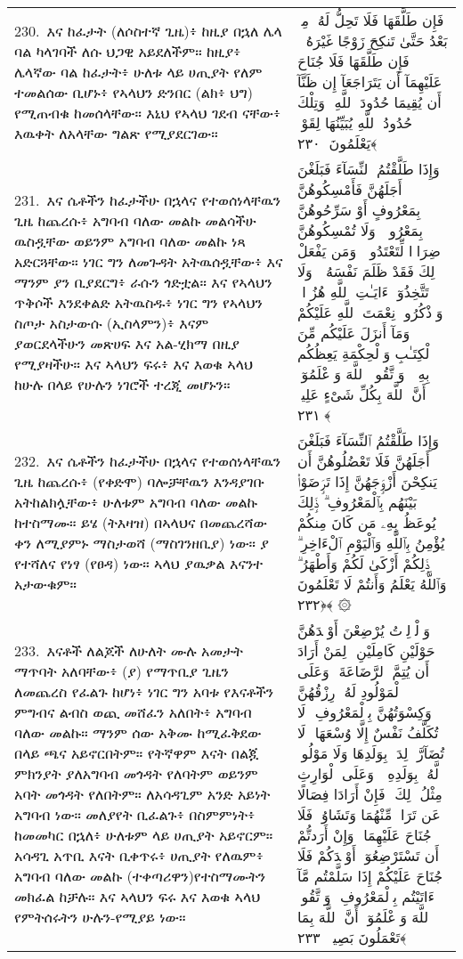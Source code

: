 \documentclass[11pt,a4paper,oneside]{article}%
\newcommand{\mytextarabic}[1]{\textarabic{ #1 \flushright}}
\begin{document}
\begin{longtable}{%
  @{}
    p{}
  @{~~~}
    p{}
    @{}
}
230.\ እና ከፈታት (ለሶስተኛ ጊዜ)፥ ከዚያ በኋለ ሌላ ባል ካላገባች ለሱ ህጋዊ አይደለችም። ከዚያ፥ ሌላኛው ባል ከፈታት፥ ሁለቱ ላይ ሀጢያት የለም ተመልሰው ቢሆኑ፥ የኣላህን ድንበር (ልክ፥ ህግ) የሚጠብቁ ከመሰላቸው። እኒህ የኣላህ ገደብ ናቸው፥ እዉቀት ለአላቸው ግልጽ የሚያደርገው። &  \mytextarabic{فَإِن طَلَّقَهَا فَلَا تَحِلُّ لَهُۥ مِنۢ بَعْدُ حَتَّىٰ تَنكِحَ زَوْجًا غَيْرَهُۥ ۗ فَإِن طَلَّقَهَا فَلَا جُنَاحَ عَلَيْهِمَآ أَن يَتَرَاجَعَآ إِن ظَنَّآ أَن يُقِيمَا حُدُودَ ٱللَّهِ ۗ وَتِلْكَ حُدُودُ ٱللَّهِ يُبَيِّنُهَا لِقَوْمٍۢ يَعْلَمُونَ ﴿٢٣٠﴾}\\
231.\ እና ሴቶችን ከፈታችሁ በኋላና የተወሰነላቸዉን ጊዜ ከጨረሱ፥ አግባብ ባለው መልኩ መልሳችሁ ዉስዷቸው ወይንም አግባብ ባለው መልኩ ነጻ አድርጓቸው። ነገር ግን ለመጉዳት አትዉሰዷቸው፥ እና ማንም ያን ቢያደርግ፥ ራሱን ጎድቷል። እና የኣላህን ጥቅሶች እንደቀልድ አትዉስዱ፥ ነገር ግን የኣላህን ስጦታ አስታውሱ (ኢስላምን)፥ እናም ያወርደላችሁን መጽሀፍ እና አል-ሂክማ በዚያ የሚያዛችሁ። እና ኣላህን ፍሩ፥ እና እወቁ ኣላህ ከሁሉ በላይ የሁሉን ነገሮች ተረጂ መሆኑን። &  \mytextarabic{ وَإِذَا طَلَّقْتُمُ ٱلنِّسَآءَ فَبَلَغْنَ أَجَلَهُنَّ فَأَمْسِكُوهُنَّ بِمَعْرُوفٍ أَوْ سَرِّحُوهُنَّ بِمَعْرُوفٍۢ ۚ وَلَا تُمْسِكُوهُنَّ ضِرَارًۭا لِّتَعْتَدُوا۟ ۚ وَمَن يَفْعَلْ ذَٟلِكَ فَقَدْ ظَلَمَ نَفْسَهُۥ ۚ وَلَا تَتَّخِذُوٓا۟ ءَايَـٰتِ ٱللَّهِ هُزُوًۭا ۚ وَٱذْكُرُوا۟ نِعْمَتَ ٱللَّهِ عَلَيْكُمْ وَمَآ أَنزَلَ عَلَيْكُم مِّنَ ٱلْكِتَـٰبِ وَٱلْحِكْمَةِ يَعِظُكُم بِهِۦ ۚ وَٱتَّقُوا۟ ٱللَّهَ وَٱعْلَمُوٓا۟ أَنَّ ٱللَّهَ بِكُلِّ شَىْءٍ عَلِيمٌۭ ﴿٢٣١﴾}\\
232.\ እና ሴቶችን ከፈታችሁ በኋላና የተወሰነላቸዉን ጊዜ ከጨረሱ፥ (የቀድሞ) ባሎቻቸዉን እንዳያገቡ አትከልክሏቸው፥ ሁለቱም አግባብ ባለው መልኩ ከተስማሙ። ይሄ (ትእዛዝ) በኣላህና በመጨረሻው ቀን ለሚያምኑ ማስታወሻ (ማስገንዘቢያ) ነው። ያ የተሻለና የነፃ (የፀዳ) ነው። ኣላህ ያዉቃል እናንተ አታውቁም። &  \mytextarabic{ وَإِذَا طَلَّقْتُمُ ٱلنِّسَآءَ فَبَلَغْنَ أَجَلَهُنَّ فَلَا تَعْضُلُوهُنَّ أَن يَنكِحْنَ أَزْوَٟجَهُنَّ إِذَا تَرَٟضَوْا۟ بَيْنَهُم بِٱلْمَعْرُوفِ ۗ ذَٟلِكَ يُوعَظُ بِهِۦ مَن كَانَ مِنكُمْ يُؤْمِنُ بِٱللَّهِ وَٱلْيَوْمِ ٱلْءَاخِرِ ۗ ذَٟلِكُمْ أَزْكَىٰ لَكُمْ وَأَطْهَرُ ۗ وَٱللَّهُ يَعْلَمُ وَأَنتُمْ لَا تَعْلَمُونَ ﴿٢٣٢﴾ ۞ }\\
233.\ እናቶች ለልጆች ለሁለት ሙሉ አመታት ማጥባት አለባቸው፥ (ያ) የማጥቢያ ጊዜን ለመጨረስ የፈልጉ ከሆነ፥ ነገር ግን አባቱ የእናቶችን ምግብና ልብስ ወጪ መሸፈን አለበት፥ አግባብ ባለው መልኩ። ማንም ሰው አቅሙ ከሚፈቅደው በላይ ጫና አይኖርበትም። የትኛዋም እናት በልጇ ምክንያት ያለአግባብ መጎዳት የለባትም ወይንም አባት መጎዳት የለበትም። ለአሳዳጊም አንድ አይነት አግባብ ነው። መለያየት ቢፈልጉ፥ በስምምነት፥ ከመመካር በኋለ፥ ሁለቱም ላይ ሀጢያት አይኖርም። አሳዳጊ አጥቢ እናት ቢቀጥሩ፥ ሀጢያት የለዉም፥ አግባብ ባለው መልኩ (ተቀጣሪዋን)የተስማሙትን መክፈል ከቻሉ። እና ኣላህን ፍሩ እና እወቁ ኣላህ የምትሰሩትን ሁሉን-የሚያይ ነው። &  \mytextarabic{وَٱلْوَٟلِدَٟتُ يُرْضِعْنَ أَوْلَٟدَهُنَّ حَوْلَيْنِ كَامِلَيْنِ ۖ لِمَنْ أَرَادَ أَن يُتِمَّ ٱلرَّضَاعَةَ ۚ وَعَلَى ٱلْمَوْلُودِ لَهُۥ رِزْقُهُنَّ وَكِسْوَتُهُنَّ بِٱلْمَعْرُوفِ ۚ لَا تُكَلَّفُ نَفْسٌ إِلَّا وُسْعَهَا ۚ لَا تُضَآرَّ وَٟلِدَةٌۢ بِوَلَدِهَا وَلَا مَوْلُودٌۭ لَّهُۥ بِوَلَدِهِۦ ۚ وَعَلَى ٱلْوَارِثِ مِثْلُ ذَٟلِكَ ۗ فَإِنْ أَرَادَا فِصَالًا عَن تَرَاضٍۢ مِّنْهُمَا وَتَشَاوُرٍۢ فَلَا جُنَاحَ عَلَيْهِمَا ۗ وَإِنْ أَرَدتُّمْ أَن تَسْتَرْضِعُوٓا۟ أَوْلَٟدَكُمْ فَلَا جُنَاحَ عَلَيْكُمْ إِذَا سَلَّمْتُم مَّآ ءَاتَيْتُم بِٱلْمَعْرُوفِ ۗ وَٱتَّقُوا۟ ٱللَّهَ وَٱعْلَمُوٓا۟ أَنَّ ٱللَّهَ بِمَا تَعْمَلُونَ بَصِيرٌۭ ﴿٢٣٣﴾}\\

\end{longtable}
\end{document}
